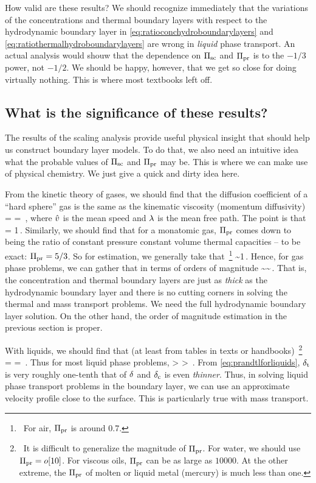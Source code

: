 How valid are these results? We should recognize immediately that the variations of the concentrations and thermal boundary layers with respect to the hydrodynamic boundary layer in \cref{eq:ratioconchydroboundarylayers} and \cref{eq:ratiothermalhydroboundarylayers} are wrong in \emph{liquid} phase transport. An actual analysis would shouw that the dependence on $\Pi_\text{sc}$ and $\Pi_\text{pr}$ is to the $-1/3$ power, not $-1/2$. We should be happy, however, that we get so close for doing virtually nothing. This is where most textbooks left off.


\subsection{What is the significance of these results?}
The results of the scaling analysis provide useful physical insight that should help us construct boundary layer models. To do that, we also need an intuitive idea what the probable values of $\Pi_\text{sc}$ and $\Pi_\text{pr}$ may be. This is where we can make use of physical chemistry. We just give a quick and dirty idea here.

From the kinetic theory of gases, we should find that the diffusion coefficient of a ``hard sphere'' gas is the same as the kinematic viscosity (momentum diffusivity)
\beq
\kmomdiff = \kvisc = \hat\lvel\mfpath\,,
\eeq
where $\hat{v}$ is the mean speed and $\lambda$ is the mean free path. The point is that
\beq
\kschmidt = 1\quad{}\,.
\eeq
Similarly, we should find that for a monatomic gas, $\Pi_\text{pr}$ comes down to being the ratio of constant pressure \vs constant volume thermal capacities -- to be exact: $\Pi_\text{pr} = 5/3$. So for estimation, we generally take that~\footnote{~For air, $\Pi_\text{pr}$ is around 0.7.}
\beq
\kprandtl \sim 1\quad{}\,.
\eeq
Hence, for gas phase problems, we can gather that in terms of orders of magnitude
\beq
\blthck\sim\tblthck\sim\cblthck\,.
\eeq
That is, the concentration and thermal boundary layers are just as \emph{thick} as the hydrodynamic boundary layer and there is no cutting corners in solving the thermal and mass transport problems. We need the full hydrodynamic boundary layer solution. On the other hand, the order of magnitude estimation in the previous section is proper.

With liquids, we should find that (at least from tables in texts or handbooks)~\footnote{~It is difficult to generalize the magnitude of $\Pi_\text{pr}$. For water, we should use $\Pi_\text{pr} = o\!\left[{10}\right]$. For viscous oils, $\Pi_\text{pr}$ can be as large as $\num{10 000}$. At the other extreme, the $\Pi_\text{pr}$ of molten or liquid metal (mercury) is much less than one.}
\bneq\label{eq:prandtlforliquids}
\kschmidt = \quad{}\quad
\kprandtl = \,.
\eneq
Thus for most liquid phase problems,
\beq
\blthck > \tblthck > \cblthck\,.
\eeq
From \cref{eq:prandtlforliquids}, $\delta_\text{t}$ is very roughly one-tenth that of $\delta$ and $\delta_\text{c}$ is even \emph{thinner}. Thus, in solving liquid phase transport problems in the boundary layer, we can use an approximate velocity profile close to the surface. This is particularly true with mass transport.


